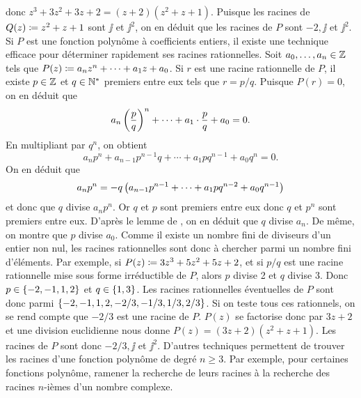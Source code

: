 \documentclass{magnolia}
\begin{document}
\begin{remarques}
  \noindent donc $z^3+3z^2+3z+2=(z+2)(z^2+z+1)$. Puisque les racines de $Q(z)\coloneqq z^2+z+1$ sont $\jj$ et
  $\jj^2$, on en déduit que les racines de $P$ sont $-2,\jj$ et $\jj^2$.
  \remarque
  Si $P$ est une fonction polynôme à coefficients entiers, il existe une technique efficace pour déterminer rapidement
  ses racines rationnelles. Soit $a_0,\ldots,a_n\in\mathbb{Z}$ tels que $P(z)\coloneqq a_n z^n+\cdots+a_1 z+a_0$.
  Si $r$ est une racine rationnelle de $P$, il existe $p\in\mathbb{Z}$ et $q\in{\mathbb{N}^*}$ premiers entre eux tels que
  $r=p/q$. Puisque $P(r)=0$, on en déduit que
  \[a_n\left(\frac{p}{q}\right)^n+\cdots+a_1\cdot\frac{p}{q}+a_0=0.\]
  En multipliant par $q^n$, on obtient
  \[a_n p^n + a_{n-1}p^{n-1}q+\cdots+a_1 p q^{n-1}+a_0 q^n=0.\]
  On en déduit que
  \[a_n p^n = -q\left(a_{n-1}p^{n-1}+\cdots+a_1 p q^{n-2}+a_0 q^{n-1}\right)\]
  et donc que $q$ divise $a_n p^n$. Or $q$ et $p$ sont premiers entre eux donc $q$ et $p^n$ sont premiers entre eux. D'après le lemme de , on en déduit que $q$ divise $a_n$. De même, on montre que $p$ divise $a_0$. Comme il existe un nombre fini de diviseurs d'un entier non nul, les racines rationnelles sont donc à chercher parmi un nombre fini d'éléments. Par exemple, si $P(z)\coloneqq 3z^3+5z^2+5z+2$, et si $p/q$ est une racine rationnelle mise sous forme irréductible de $P$, alors $p$ divise 2 et $q$ divise 3. Donc $p\in\left\{-2,-1,1,2\right\}$ et $q\in\left\{1, 3\right\}$. Les racines rationnelles éventuelles de $P$ sont donc parmi $\left\{-2,-1,1,2,-2/3,-1/3,1/3,2/3\right\}$. Si on teste tous ces rationnels, on se rend compte que $-2/3$ est une racine de $P$. $P(z)$ se factorise donc par $3z+2$ et une division euclidienne nous donne $P(z)=(3z+2)(z^2+z+1)$. Les racines de $P$ sont donc $-2/3,\jj$ et $\jj^2$.
  \remarque D'autres techniques permettent de trouver les racines d'une fonction polynôme de degré $n\geq 3$. Par exemple, pour certaines fonctions polynôme, ramener la recherche de leurs racines à la recherche des racines $n$-ièmes d'un nombre complexe.
  \end{remarques}
  
  
  
\end{document}

